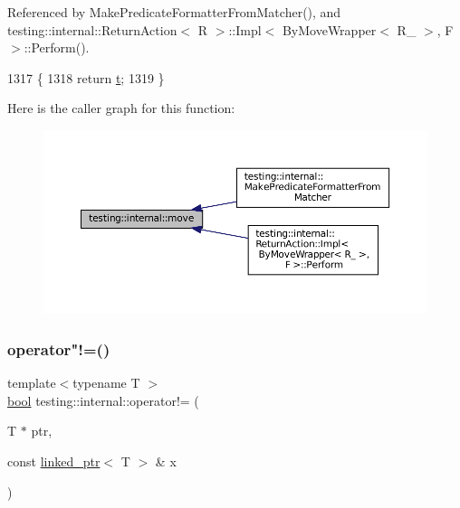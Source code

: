Referenced by Make\+Predicate\+Formatter\+From\+Matcher(), and testing\+::internal\+::\+Return\+Action$<$ R $>$\+::\+Impl$<$ By\+Move\+Wrapper$<$ R\+\_\+ $>$, F $>$\+::\+Perform().


\begin{DoxyCode}
1317                           \{
1318   \textcolor{keywordflow}{return} \hyperlink{namespacebattery__monitor__node_a7a63d20d1ea461e280f4eb5b47f925cd}{t};
1319 \}
\end{DoxyCode}
Here is the caller graph for this function\+:
\nopagebreak
\begin{figure}[H]
\begin{center}
\leavevmode
\includegraphics[width=350pt]{namespacetesting_1_1internal_a0f6d06bf8c3093b9c22bb08723db201e_icgraph}
\end{center}
\end{figure}
\mbox{\label{namespacetesting_1_1internal_a6910869259f8f31825b471e9190fa09a}} 
\subsubsection{\texorpdfstring{operator"!=()}{operator!=()}}
{\footnotesize\ttfamily template$<$typename T $>$ \\
\hyperlink{classbool}{bool} testing\+::internal\+::operator!= (\begin{DoxyParamCaption}\item[{T $\ast$}]{ptr,  }\item[{const \hyperlink{classtesting_1_1internal_1_1linked__ptr}{linked\+\_\+ptr}$<$ T $>$ \&}]{x }\end{DoxyParamCaption})\hspace{0.3cm}{\ttfamily [inline]}}



